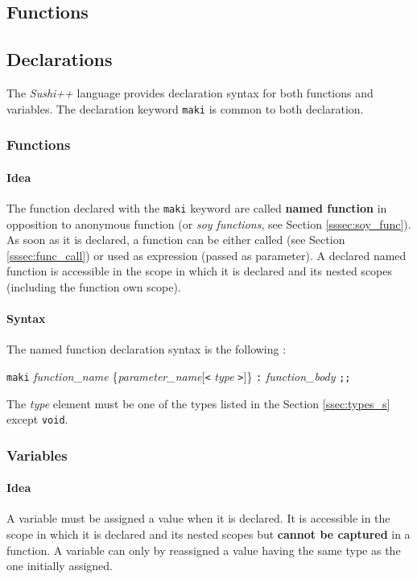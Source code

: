 \documentclass[a4paper,11pt]{article}
\begin{document}
\subsection{Functions}
\label{sssec:functions}

\subsection{Declarations}

The \textit{Sushi++} language provides declaration syntax for both functions and variables. The declaration keyword \texttt{maki} is common to both declaration.

\subsubsection{Functions}
\label{sssec:decl_func}
\paragraph{Idea} The function declared with the \texttt{maki} keyword are called \textbf{named function} in opposition to anonymous function (or \textit{soy functions}, see Section \ref{sssec:soy_func}). As soon as it is declared, a function can be either called (see Section \ref{sssec:func_call}) or used as expression (passed as parameter). A declared named function is accessible in the scope in which it is declared and its nested scopes (including the function own scope).
\paragraph{Syntax}  The named function declaration syntax is the following :
\begin{center}
\texttt{maki} \textit{function\_name} \{\textit{parameter\_name}[\texttt{<} \textit{type} \texttt{>}]\} \texttt{:} \textit{function\_body} \texttt{;;}
\end{center}
The \textit{type} element must be one of the types listed in the Section \ref{ssec:types_s} except \texttt{void}.
\subsubsection{Variables}
\paragraph{Idea} A variable must be assigned a value when it is declared. It is accessible in the scope in which it is declared and its nested scopes but \textbf{cannot be captured} in a function. A variable can only by reassigned a value having the same type as the one initially assigned.
\end{document}
